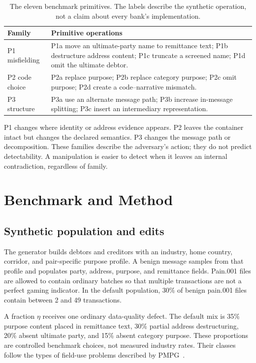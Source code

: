 \documentclass[conference]{IEEEtran}
\begin{document}
\begin{table}[!t]
\caption{The eleven benchmark primitives. The labels describe the synthetic
operation, not a claim about every bank's implementation.}
\label{tab:taxonomy}
\centering
\scriptsize
\begin{tabularx}{\columnwidth}{@{}lX@{}}
\toprule
Family & Primitive operations \\
\midrule
P1 misfielding & P1a move an ultimate-party name to remittance text; P1b
destructure address content; P1c truncate a screened name; P1d omit the
ultimate debtor. \\
P2 code choice & P2a replace purpose; P2b replace category purpose; P2c omit
purpose; P2d create a code--narrative mismatch. \\
P3 structure & P3a use an alternate message path; P3b increase in-message
splitting; P3c insert an intermediary representation. \\
\bottomrule
\end{tabularx}
\end{table}

P1 changes where identity or address evidence appears. P2 leaves the container
intact but changes the declared semantics. P3 changes the message path or
decomposition. These families describe the adversary's action; they do not
predict detectability. A manipulation is easier to detect when it leaves an
internal contradiction, regardless of family.

\section{Benchmark and Method}
\subsection{Synthetic population and edits}
The generator builds debtors and creditors with an industry, home country,
corridor, and pair-specific purpose profile. A benign message samples from
that profile and populates party, address, purpose, and remittance fields.
Pain.001 files are allowed to contain ordinary batches so that multiple
transactions are not a perfect gaming indicator. In the default population,
30\% of benign pain.001 files contain between 2 and 49 transactions.

A fraction $\eta$ receives one ordinary data-quality defect. The default mix
is 35\% purpose content placed in remittance text, 30\% partial address
destructuring, 20\% absent ultimate party, and 15\% absent category purpose.
These proportions are controlled benchmark choices, not measured industry
rates. Their classes follow the types of field-use problems described by
PMPG~\cite{pmpg2024}.
\end{document}
